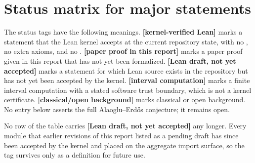 \documentclass[11pt,oneside]{article}
\theoremstyle{definition}
\theoremstyle{remark}
\newcommand{\lean}[1]{\texttt{\detokenize{#1}}}
\newcommand{\statuslean}{\textcolor{leanblue}{\textbf{[kernel-verified Lean]}}}
\newcommand{\statusnew}{\textcolor{newgreen}{\textbf{[paper proof in this report]}}}
\newcommand{\statuscomp}{\textcolor{computeviolet}{\textbf{[interval computation]}}}
\newcommand{\statusknown}{\textcolor{classicalgray}{\textbf{[classical/open background]}}}
\newcommand{\statusdraft}{\textcolor{computeviolet}{\textbf{[Lean draft, not yet accepted]}}}
\begin{document}
\appendix

\section{Status matrix for major statements}
\label{app:status}

The status tags have the following meanings.  \statuslean{} marks a statement that the Lean
kernel accepts at the current repository state, with no \lean{sorry}, no extra axioms, and no
\lean{native_decide}.  \statusnew{} marks a paper proof given in this report that has not yet
been formalized.  \statusdraft{} marks a statement for which Lean source exists in the
repository but has not yet been accepted by the kernel.  \statuscomp{} marks a finite
interval computation with a stated software trust boundary, which is not a kernel
certificate.  \statusknown{} marks classical or open background.  No entry below asserts the
full Alaoglu--Erd\H{o}s conjecture; it remains open.

No row of the table carries \statusdraft{} any longer.  Every module that earlier revisions
of this report listed as a pending draft has since been accepted by the kernel and placed on
the aggregate import surface, so the tag survives only as a definition for future use.
\end{document}
